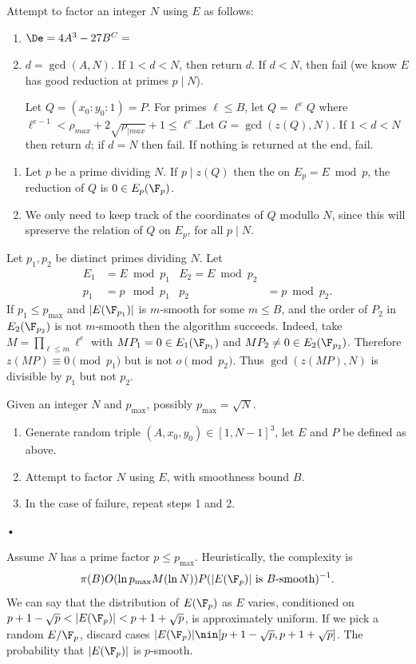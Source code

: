 Attempt to factor an integer $N$ using $E$ as follows:
\begin{enumerate}
\item
$\De=4A^3-27B^C=$
\item
$d=\gcd(A,N)$. If $1<d<N$, then return $d$. If $d<N$, then fail (we know $E$ has good reduction at primes $p\mid N$).

Let $Q=(x_0:y_0:1)=P$. For primes $\ell\le B$, let $Q=\ell^eQ$ where $\ell^{e-1}<\rho_{max} +2\sqrt{\rho_{|max}}+1\le \ell^e$.Let $G=\gcd(z(Q),N)$. If $1<d<N$ then return $d$; if $d=N$ then fail. If nothing is returned at the end, fail.
\end{enumerate}
\begin{rem}
\begin{enumerate}
\item
Let $p$ be a prime dividing $N$. If $p\mid z(Q)$ then the on $E_p=E\bmod p$, the reduction of $Q$ is $0\in E_p(\F_p)$.
\item We only need to keep track of the coordinates of $Q$ modullo $N$, since this will spreserve the relation of $Q$ on $E_p$, for all $p\mid N$. 
\end{enumerate}
\end{rem}
Let $p_1,p_2$ be distinct primes dividing $N$. Let 
\begin{align*}
E_1&=E\bmod{p_1} & E_2=E\bmod{p_2}\\
p_1&= p\mod{p_1} & p_2 &= p\bmod{p_2}.
\end{align*}
If $p_1\le p_{\max}$ and $|E(\F_{p_1})|$ is $m$-smooth 
for some $m\le B$, and the order of $P_2$ in $E_2(\F_{p_2})$ is not $m$-smooth then the algorithm succeeds.
Indeed, take $M=\prod_{\ell\le m}\ell^e$ with $MP_1=0\in E_1(\F_{p_1})$ and $MP_2\ne 0 \in E_2(\F_{p_2})$. Therefore $z(MP)\equiv 0\pmod{p_1}$ but is not $o\pmod{p_2}$. Thus $\gcd(z(MP), N)$ is divisible by $p_1$ but not $p_2$.
\begin{alg}
Given an integer $N$ and $p_{\max}$, possibly $p_{\max}=\sqrt N$.
\begin{enumerate}
\item
Generate random triple $(A,x_0,y_0)\in [1,N-1]^3$, let $E$ and $P$ be defined as above. 
\item 
Attempt to factor $N$ using $E$, with smoothness bound $B$.
\item In the case of failure, repeat steps 1 and 2.
\end{enumerate}•
\end{alg}
Assume $N$ has a prime factor $p\le p_{\max }$. Heuristically, the complexity is
\[
\pi(B) O(\ln p_{\max} M(\ln N)) P(|E(\F_p)| \text{ is $B$-smooth})^{-1}.
\]
We can say that the distribution of $E(\F_p)$ as $E$ varies, conditioned on $p+1-\sqrt p<|E(\F_p)|<p+1+\sqrt p$, is approximately uniform. If we pick a random $E/\F_p$, discard cases $|E(\F_p)|\nin [p+1-\sqrt p,p+1+\sqrt p]$. The probability that $|E(\F_p)|$ is $p$-smooth.

